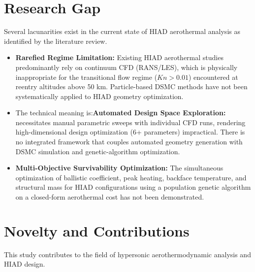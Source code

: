 \section{Research Gap}
Several lacunarities exist in the current state of HIAD aerothermal analysis as identified by the literature review.
\begin{itemize}
    \item \textbf{Rarefied Regime Limitation:} Existing HIAD aerothermal studies predominantly rely on continuum CFD (RANS/LES), which is physically inappropriate for the transitional flow regime ($Kn > 0.01$) encountered at reentry altitudes above 50 km. Particle-based DSMC methods have not been systematically applied to HIAD geometry optimization.

    \item The technical meaning is:\textbf{Automated Design Space Exploration:} necessitates manual parametric sweeps with individual CFD runs, rendering high-dimensional design optimization (6+ parameters) impractical. There is no integrated framework that couples automated geometry generation with DSMC simulation and genetic-algorithm optimization.


    \item \textbf{Multi-Objective Survivability Optimization:} The simultaneous optimization of ballistic coefficient, peak heating, backface temperature, and structural mass for HIAD configurations using a population genetic algorithm on a closed-form aerothermal cost has not been demonstrated.
\end{itemize}

\section{Novelty and Contributions}
This study contributes to the field of hypersonic aerothermodynamic analysis and HIAD design.

